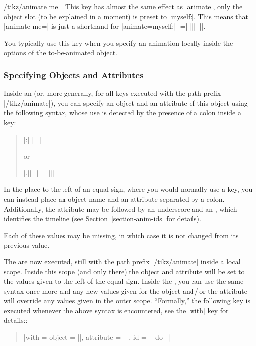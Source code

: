 \begin{key}{/tikz/animate me=}
  This key has almost the same effect as |animate|, only the object
  slot (to be explained in a moment) is preset to |myself:|. This
  means that |animate me=| is just a shorthand for
  |animate={myself:| |=| |{||}| |}|.

  You typically use this key when you specify an animation locally
  inside the options of the to-be-animated object.
\end{key}



\subsubsection{Specifying Objects and Attributes}

\label{section-anim-syntax-obj}

Inside an  (or, more generally, for all
keys executed with the path prefix |/tikz/animate|), you can specify
an object and an attribute of this object using the following syntax,
whose use is detected by the presence of a colon inside a key:
\begin{quote}
  \normalfont
  |:|
  |={||}|
  
  or
  
  |:||_|
  |={||}| 
\end{quote}
In the place to the left of an equal sign, where you would
normally use a key, you can instead place an object name and an
attribute separated by a colon. Additionally, the attribute may be
followed by an underscore and an , which identifies the
timeline (see Section~\ref{section-anim-ids} for details). 

Each of these values may be missing, in which case it is not changed
from its previous value.

The  are now executed, still with the path prefix
|/tikz/animate| inside a local scope. Inside this scope (and only
there) the object and attribute will be set to the values given to the
left of the equal sign. Inside the , you can use the
same syntax once more and any new values given for the object
and\,/\,or the attribute will override any values given in the outer
scope. ``Formally,'' the
following key is executed whenever the above syntax is encountered,
see the |with| key for details::
\begin{quote}
  \normalfont
  |with = {object = ||, attribute = |%
    |, id = ||} do {||}|
\end{quote}

